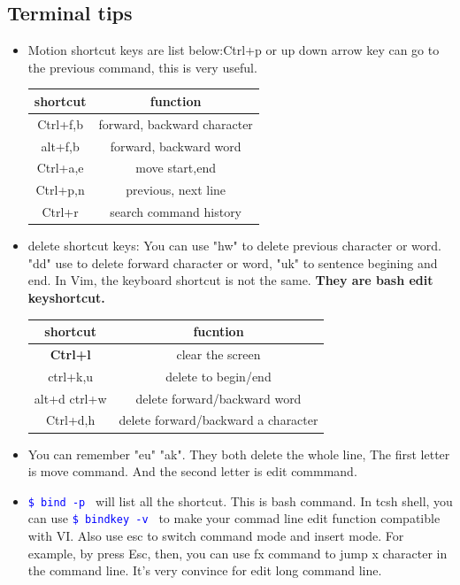 \documentclass[a4paper,12pt,twoside]{book}
\newcommand{\linuxcommand}[1]{\texttt{\textcolor{blue}{\$ #1 \Pisymbol{psy}{191}}}}
\begin{document}
\subsection{Terminal tips}

\begin{itemize}

		\item Motion shortcut keys are list below:Ctrl+p or up down arrow key can go to the previous command, this is very useful. 
\begin{center}
  \begin{tabular}{c|c}
 \hline shortcut & function \\
\hline Ctrl+f,b & forward, backward character \\
\hline alt+f,b & forward, backward word \\
\hline Ctrl+a,e & move start,end \\
\hline Ctrl+p,n & previous, next line \\
\hline Ctrl+r & search command history \\
 \hline
  \end{tabular}
\end{center}

\item delete shortcut keys: You can use "hw" to delete previous character or word. "dd" use to delete forward character or word, "uk" to sentence begining and end. In Vim, the keyboard shortcut is not the same. \textbf{They are bash edit keyshortcut.}

\begin{center}
  \begin{tabular}{|c|c|}
 \hline shortcut & fucntion \\
 \hline \textbf{Ctrl+l} & clear the screen \\	
\hline ctrl+k,u & delete to begin/end \\
\hline alt+d ctrl+w & delete forward/backward word \\
\hline Ctrl+d,h  & delete forward/backward a character  \\
 \hline
  \end{tabular}
\end{center}

\item You can remember "eu" "ak". They both delete the whole line, The first letter is move command. And the second letter is edit commmand. 

\item \linuxcommand{bind -p} will list all the shortcut. This is bash command. In tcsh shell, you can use \linuxcommand{bindkey -v} to make your commad line edit function compatible with VI. Also use esc to switch command mode and insert mode. For example, by press Esc, then, you can use fx command to jump x character in the command line. It's very convince for edit long command line.


\end{itemize}
\end{document}
